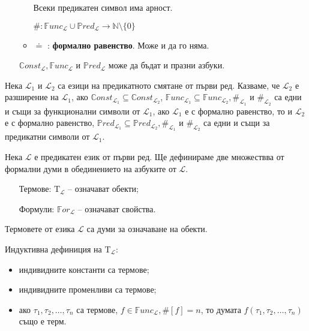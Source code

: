 \documentclass{article}
\newcommand{\Tau}{\mathrm{T}}
\begin{document}
\begin{mydef}
\begin{enumerate}
\begin{itemize}
Всеки предикатен символ има арност.

\begin{remark}
$\#: \mathbb{F}unc_\mathcal{L} \cup \mathbb{P}red_\mathcal{L} \longrightarrow \mathbb{N} \setminus \{0\}$
\end{remark}
\item $\bm{\doteq}$ : \textbf{формално равенство}. Може и да го няма.
\end{itemize}

\begin{remark}
$\mathbb{C}onst_\mathcal{L}, \mathbb{F}unc_\mathcal{L}$ и $\mathbb{P}red_\mathcal{L}$ може да бъдат и празни азбуки.
\end{remark}
\end{enumerate}

\end{mydef}

\begin{mydef}[Разширение]
Нека $\mathcal{L}_1$ и $\mathcal{L}_2$ са езици на предикатното смятане от първи ред. Казваме, че $\mathcal{L}_2$ е разширение на $\mathcal{L}_1$, ако $\mathbb{C}onst_{\mathcal{L}_1} \subseteq \mathbb{C}onst_{\mathcal{L}_2}$, $\mathbb{F}unc_{\mathcal{L}_1} \subseteq \mathbb{F}unc_{\mathcal{L}_2}, \#_{\mathcal{L}_1}$ и $\#_{\mathcal{L}_2}$ са едни и същи за функционални символи от $\mathcal{L}_1$, ако $\mathcal{L}_1$ е с формално равенство, то и $\mathcal{L}_2$ е с формално равенство, $\mathbb{P}red_{\mathcal{L}_1} \subseteq \mathbb{P}red_{\mathcal{L}_2}, \#_{\mathcal{L}_1}$ и $\#_{\mathcal{L}_2}$ са едни и същи за предикатни символи от $\mathcal{L}_1$.
\end{mydef}

\begin{mydef}
Нека $\mathcal{L}$ е предикатен език от първи ред. Ще дефинираме две множествва от формални думи в обединението на азбуките от $\mathcal{L}$.
\begin{itemize}
\item[Термове:] $\Tau_\mathcal{L}$ -- означават обекти;
\item[Формули:] $\mathbb{F}or_\mathcal{L}$ -- означават свойства.
\end{itemize}
\end{mydef}

\begin{mydef}[Термове]
Термовете от езика $\mathcal{L}$ са думи за означаване на обекти.

Индуктивна дефиниция на $\Tau_\mathcal{L}$:
\begin{itemize}
\item индивидните константи са термове;
\item индивидните променливи са термове;
\item ако $\tau_1, \tau_2, \ldots, \tau_n$ са термове, $f \in \mathbb{F}unc_\mathcal{L}, \#[f] = n$, то думата $f(\tau_1, \tau_2, \ldots, \tau_n)$ също е терм.
\end{itemize}

\end{mydef}
\end{document}
